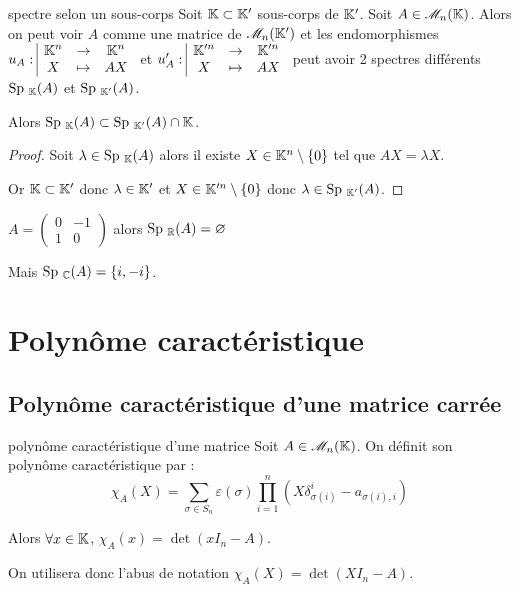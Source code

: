 \begin{proposition}{spectre selon un sous-corps}{}
    Soit $\mathbb{K} \subset \mathbb{K}'$ sous-corps de $\mathbb{K}'$. 
    Soit $A \in \mathscr M_n(\mathbb{K})$. Alors on peut voir $A$ comme une matrice de 
    $\mathscr M_n(\mathbb{K}')$ et les endomorphismes 
    $u_A: \space \begin{array}{|ccc} \displaystyle \mathbb{K}^n & \to & \displaystyle \mathbb{K}^n \\ \displaystyle X & \mapsto & \displaystyle AX \end{array}$ et
    $u'_A: \space \begin{array}{|ccc} \displaystyle \mathbb{K}'^n & \to & \displaystyle \mathbb{K}'^n \\ \displaystyle X & \mapsto & \displaystyle AX \end{array}$ peut avoir 2 spectres différents 
    $\operatorname{Sp} \,_{\mathbb{K}} (A)$ et $\operatorname{Sp} \,_{\mathbb{K}'}(A)$.

    Alors $\operatorname{Sp} \,_{\mathbb{K}} (A) \subset \operatorname{Sp} \,_{\mathbb{K}'}(A) \cap \mathbb{K}$.
\end{proposition}

\begin{proof}
    Soit $\lambda \in \operatorname{Sp} \,_{\mathbb{K}} (A)$ alors il existe $X \in \mathbb{K}^n \setminus \{0\}$ tel que
    $AX = \lambda X$.

    Or $\mathbb{K} \subset \mathbb{K}'$ donc $\lambda \in \mathbb{K}'$ et $X \in \mathbb{K}'^n \setminus \{0\}$ donc
    $\lambda \in \operatorname{Sp} \,_{\mathbb{K}'}(A)$.
\end{proof}

\begin{exemple}
    $A = \begin{pmatrix}
        0 & -1 \\
        1 & 0
    \end{pmatrix}$ alors $\operatorname{Sp} \,_{\mathbb{R}}(A) = \varnothing$ 

    Mais $\operatorname{Sp} \,_{\mathbb{C}}(A) = \{i, -i\}$.
\end{exemple}


\section{Polynôme caractéristique }
\subsection{Polynôme caractéristique d'une matrice carrée}

\begin{definition}{polynôme caractéristique d'une matrice}{}
    Soit $A \in \mathscr M_n (\mathbb{K})$. On définit son polynôme caractéristique par : 
    \[
        \chi_A(X) = \sum_{\sigma \in S_n} \varepsilon(\sigma) \prod_{i = 1 }^{ n } (X \delta_{\sigma(i)}^i - a_{\sigma(i), i})
    \]

    Alors $\forall x \in \mathbb{K}$, $\chi_A(x) = \det (x I_n - A)$.

    On utilisera donc l'abus de notation $\chi_A(X) = \det (X I_n - A)$.
\end{definition}


